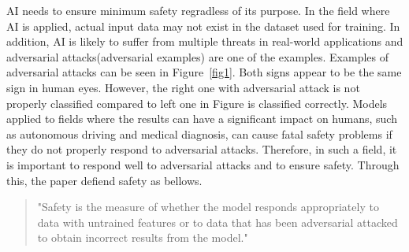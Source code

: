 \documentclass[journal,article,submit,moreauthors,pdftex]{Definitions/mdpi}
\begin{document}
AI needs to ensure minimum safety regradless of its purpose. In the field where AI is applied, actual input data may not exist in the dataset used for training.
In addition, AI is likely to suffer from multiple threats in real-world applications and adversarial attacks(adversarial examples) are one of the examples.
Examples of adversarial attacks can be seen in Figure~\ref{fig1}. Both signs appear to be the same sign in human eyes. However, the right one with adversarial attack is not properly classified compared to left one in Figure is classified correctly.
Models applied to fields where the results can have a significant impact on humans, such as autonomous driving and medical diagnosis, can cause fatal safety problems if they do not properly respond to adversarial attacks. Therefore, in such a field, it is important to respond well to adversarial attacks and to ensure safety.
Through this, the paper defiend safety as bellows.

\begin{quote}
    "Safety is the measure of whether the model responds appropriately to data with untrained features or to data that has been adversarial attacked to obtain incorrect results from the model."
\end{quote}
\end{document}
